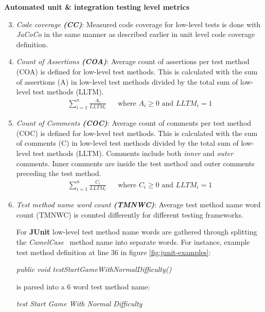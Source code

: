     \begin{addmargin}[0em]{0em}
    \vspace{10px}
    \textbf{Automated unit \& integration testing level metrics}
    \vspace{5px}
    \newline
    \begin{enumerate}
    \setcounter{enumi}{2}
    \item \textit{Code coverage \textbf{(CC)}}:
    Measured code coverage for low-level tests is done with \textit{JaCoCo} in the same manner as described earlier in
    unit level code coverage definition.

    \item \textit{Count of Assertions \textbf{(COA)}}:
    Average count of assertions per test method (COA) is defined for low-level test methods. This is calculated with
    the sum of assertions (A) in low-level test methods divided by the total sum of low-level test methods (LLTM).
    \begin{align*}
        \sum_{i=1}^{n}\frac{A_{i}}{LLTM_{i}} && \text {where } A_{i} \geq 0 \text{ and } LLTM_{i} = 1
    \end{align*}

    \item \textit{Count of Comments \textbf{(COC)}}:
    Average count of comments per test method (COC) is defined for low-level test methods. This is calculated with the
    sum of comments (C) in low-level test methods divided by the total sum of low-level test methods (LLTM). Comments include both
    \textit{inner} and \textit{outer} comments. Inner comments are inside the test method and outer comments preceding the test method.
    \begin{align*}
        \sum_{i=1}^{n}\frac{C_{i}}{LLTM_{i}} && \text {where } C_{i} \geq 0 \text{ and } LLTM_{i} = 1
    \end{align*}

    \item \textit{Test method name word count \textbf{(TMNWC)}}:
    Average test method name word count (TMNWC) is counted differently for different testing frameworks.

    For \textbf{JUnit} low-level test method name words are gathered through splitting the \textit{CamelCase}~\cite{wiki:camelcase}
    method name into separate words. For instance, example test method definition at line 36 in figure \ref{fig:junit-examples}:


    \begin{addmargin}[0em]{0em}
    \vspace{10px}
    \textit{public void testStartGameWithNormalDifficulty()}
    \newline
    \end{addmargin}
    is parsed into a 6 word test method name:
    \begin{addmargin}[0em]{0em}
    \vspace{10px}
    \textit{test Start Game With Normal Difficulty}
    \newline
    \end{addmargin}


\end{enumerate}
\end{addmargin}
